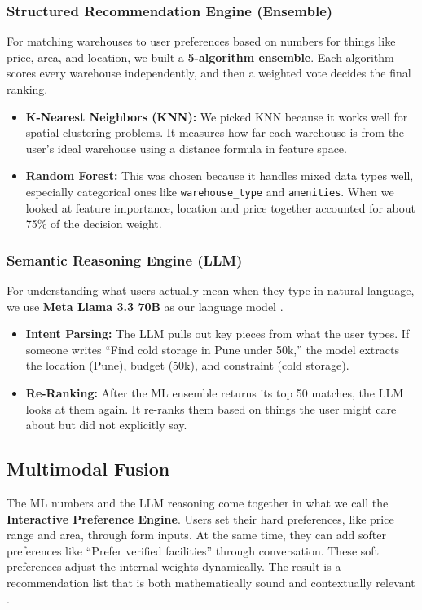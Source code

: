 \documentclass[conference]{IEEEtran}
\begin{document}
\subsubsection{Structured Recommendation Engine (Ensemble)}
For matching warehouses to user preferences based on numbers for things like price, area, and location, we built a \textbf{5-algorithm ensemble}. Each algorithm scores every warehouse independently, and then a weighted vote decides the final ranking.
\begin{itemize}
    \item \textbf{K-Nearest Neighbors (KNN):} We picked KNN because it works well for spatial clustering problems. It measures how far each warehouse is from the user's ideal warehouse using a distance formula in feature space.
    \item \textbf{Random Forest:} This was chosen because it handles mixed data types well, especially categorical ones like \texttt{warehouse\_type} and \texttt{amenities}. When we looked at feature importance, location and price together accounted for about 75\% of the decision weight.
\end{itemize}

\subsubsection{Semantic Reasoning Engine (LLM)}
For understanding what users actually mean when they type in natural language, we use \textbf{Meta Llama 3.3 70B} as our language model \cite{b8}.
\begin{itemize}
    \item \textbf{Intent Parsing:} The LLM pulls out key pieces from what the user types. If someone writes ``Find cold storage in Pune under 50k,'' the model extracts the location (Pune), budget (50k), and constraint (cold storage).
    \item \textbf{Re-Ranking:} After the ML ensemble returns its top 50 matches, the LLM looks at them again. It re-ranks them based on things the user might care about but did not explicitly say.
\end{itemize}

\subsection{Multimodal Fusion}
The ML numbers and the LLM reasoning come together in what we call the \textbf{Interactive Preference Engine}. Users set their hard preferences, like price range and area, through form inputs. At the same time, they can add softer preferences like ``Prefer verified facilities'' through conversation. These soft preferences adjust the internal weights dynamically. The result is a recommendation list that is both mathematically sound and contextually relevant \cite{b9}.
\end{document}
